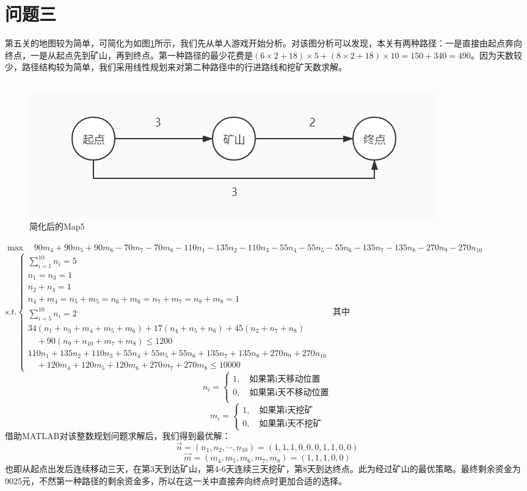 \documentclass[withoutpre]{cumcmthesis} %
\begin{document}
\section{问题三}
第五关的地图较为简单，可简化为如图\ref{fig:map5}所示，我们先从单人游戏开始分析。对该图分析可以发现，本关有两种路径：一是直接由起点奔向终点，一是从起点先到矿山，再到终点。第一种路径的最少花费是$(6\times2+18)\times5+(8\times2+18)\times10=150+340=490$。因为天数较少，路径结构较为简单，我们采用线性规划来对第二种路径中的行进路线和挖矿天数求解。\\\\
\begin{figure}[H]
	\centering
	\includegraphics[scale=0.5]{figures/map3.jpg}
	\caption{简化后的Map5}
	\label{fig:map5}
\end{figure}
$\max\quad 90m_4+90m_5+90m_6-70m_7-70m_8-110n_1-135n_2-110n_3-55n_4-55n_5-55n_6-135n_7-135n_8-270n_9-270n_{10}$\\
$s.t.\begin{cases}
	\sum_{i=1}^{10}n_i=5\\
	n_1=n_3=1\\
	n_2+n_4=1\\
	n_4+m_4=n_5+m_5=n_6+m_6=n_7+m_7=n_8+m_8=1\\
	\sum_{i=5}^{10}n_i=2\\
	34(n_1+n_3+m_4+m_5+m_6)+17(n_4+n_5+n_6)+45(n_2+n_7+n_8)\\\quad+90(n_9+n_{10}+m_7+m_8)\leqslant1200\\
	110n_1+135n_2+110n_3+55n_4+55n_5+55n_6+135n_7+135n_8+270n_9+270n_{10}\\\quad+120m_4+120m_5+120m_6+270m_7+270m_8\leqslant10000
\end{cases}$
其中
$$n_i=\begin{cases}
1,\quad\text{如果第i天移动位置}\\
0,\quad\text{如果第i天不移动位置}\\
\end{cases}$$
$$m_i=\begin{cases}
1,\quad\text{如果第i天挖矿}\\
0,\quad\text{如果第i天不挖矿}
\end{cases}$$
借助MATLAB对该整数规划问题求解后，我们得到最优解：
$$\overrightarrow{n}=(n_1,n_2,\cdots,n_{10})=(1,1,1,0,0,0,1,1,0,0)$$
$$\overrightarrow{m}=(m_4,m_5,m_6,m_7,m_8)=(1,1,1,0,0)$$
也即从起点出发后连续移动三天，在第3天到达矿山，第4-6天连续三天挖矿，第8天到达终点。此为经过矿山的最优策略。最终剩余资金为9025元，不然第一种路径的剩余资金多，所以在这一关中直接奔向终点时更加合适的选择。
\begin{thebibliography}{9}%

    

\end{thebibliography}
\end{document}
